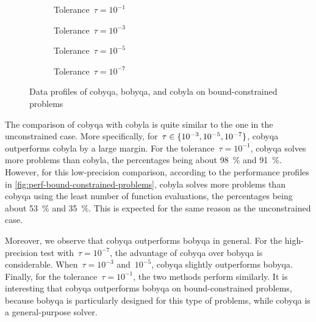 \begin{figure}[ht]
    \centering
    \begin{subfigure}[b]{0.49\textwidth}
        \centering
        \caption{Tolerance~$\tau = 10^{-1}$}
    \end{subfigure}
    \hfill
    \begin{subfigure}[b]{0.49\textwidth}
        \centering
        \caption{Tolerance~$\tau = 10^{-3}$}
    \end{subfigure}
    \begin{subfigure}[b]{0.49\textwidth}
        \centering
        \caption{Tolerance~$\tau = 10^{-5}$}
    \end{subfigure}
    \hfill
    \begin{subfigure}[b]{0.49\textwidth}
        \centering
        \caption{Tolerance~$\tau = 10^{-7}$}
    \end{subfigure}
    \caption[Data profiles on bound-constrained problems]{Data profiles of \gls{cobyqa}, \gls{bobyqa}, and \gls{cobyla} on bound-constrained problems}
    \label{fig:data-bound-constrained-problems}
\end{figure}

The comparison of \gls{cobyqa} with \gls{cobyla} is quite similar to the one in the unconstrained case.
More specifically, for~$\tau \in \{10^{-3}, 10^{-5}, 10^{-7}\}$, \gls{cobyqa} outperforms \gls{cobyla} by a large margin.
For the tolerance~$\tau = 10^{-1}$, \gls{cobyqa} solves more problems than \gls{cobyla}, the percentages being about \SI{98}{\percent} and \SI{91}{\percent}.
However, for this low-precision comparison, according to the performance profiles in \cref{fig:perf-bound-constrained-problems}, \gls{cobyla} solves more problems than \gls{cobyqa} using the least number of function evaluations, the percentages being about \SI{53}{\percent} and \SI{35}{\percent}.
This is expected for the same reason as the unconstrained case.

Moreover, we observe that \gls{cobyqa} outperforms \gls{bobyqa} in general.
For the high-precision test with~$\tau = 10^{-7}$, the advantage of \gls{cobyqa} over \gls{bobyqa} is considerable.
When~$\tau = 10^{-3}$ and~$10^{-5}$, \gls{cobyqa} slightly outperforms \gls{bobyqa}.
Finally, for the tolerance~$\tau = 10^{-1}$, the two methods perform similarly.
It is interesting that \gls{cobyqa} outperforms \gls{bobyqa} on bound-constrained problems, because \gls{bobyqa} is particularly designed for this type of problems, while \gls{cobyqa} is a general-purpose solver.

